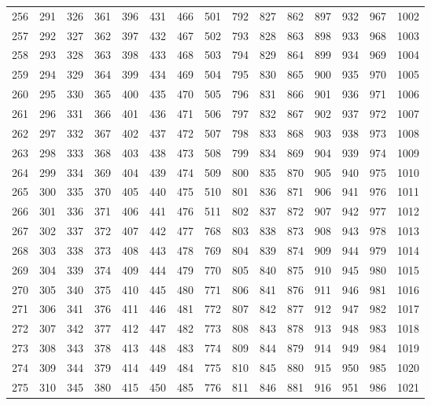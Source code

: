 \documentclass{assignment}
\begin{document}
\begin{tabular}{r r r r r r r r r r r r r r r}
256 & 291 & 326 & 361 & 396 & 431 & 466 & 501 & 792 & 827 & 862 & 897 & 932 & 967 & 1002 \\
257 & 292 & 327 & 362 & 397 & 432 & 467 & 502 & 793 & 828 & 863 & 898 & 933 & 968 & 1003 \\
258 & 293 & 328 & 363 & 398 & 433 & 468 & 503 & 794 & 829 & 864 & 899 & 934 & 969 & 1004 \\
259 & 294 & 329 & 364 & 399 & 434 & 469 & 504 & 795 & 830 & 865 & 900 & 935 & 970 & 1005 \\
260 & 295 & 330 & 365 & 400 & 435 & 470 & 505 & 796 & 831 & 866 & 901 & 936 & 971 & 1006 \\
261 & 296 & 331 & 366 & 401 & 436 & 471 & 506 & 797 & 832 & 867 & 902 & 937 & 972 & 1007 \\
262 & 297 & 332 & 367 & 402 & 437 & 472 & 507 & 798 & 833 & 868 & 903 & 938 & 973 & 1008 \\
263 & 298 & 333 & 368 & 403 & 438 & 473 & 508 & 799 & 834 & 869 & 904 & 939 & 974 & 1009 \\
264 & 299 & 334 & 369 & 404 & 439 & 474 & 509 & 800 & 835 & 870 & 905 & 940 & 975 & 1010 \\
265 & 300 & 335 & 370 & 405 & 440 & 475 & 510 & 801 & 836 & 871 & 906 & 941 & 976 & 1011 \\
266 & 301 & 336 & 371 & 406 & 441 & 476 & 511 & 802 & 837 & 872 & 907 & 942 & 977 & 1012 \\
267 & 302 & 337 & 372 & 407 & 442 & 477 & 768 & 803 & 838 & 873 & 908 & 943 & 978 & 1013 \\
268 & 303 & 338 & 373 & 408 & 443 & 478 & 769 & 804 & 839 & 874 & 909 & 944 & 979 & 1014 \\
269 & 304 & 339 & 374 & 409 & 444 & 479 & 770 & 805 & 840 & 875 & 910 & 945 & 980 & 1015 \\
270 & 305 & 340 & 375 & 410 & 445 & 480 & 771 & 806 & 841 & 876 & 911 & 946 & 981 & 1016 \\
271 & 306 & 341 & 376 & 411 & 446 & 481 & 772 & 807 & 842 & 877 & 912 & 947 & 982 & 1017 \\
272 & 307 & 342 & 377 & 412 & 447 & 482 & 773 & 808 & 843 & 878 & 913 & 948 & 983 & 1018 \\
273 & 308 & 343 & 378 & 413 & 448 & 483 & 774 & 809 & 844 & 879 & 914 & 949 & 984 & 1019 \\
274 & 309 & 344 & 379 & 414 & 449 & 484 & 775 & 810 & 845 & 880 & 915 & 950 & 985 & 1020 \\
275 & 310 & 345 & 380 & 415 & 450 & 485 & 776 & 811 & 846 & 881 & 916 & 951 & 986 & 1021 \\

\end{tabular}
\end{document}
